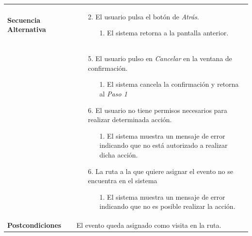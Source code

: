 \begin{longtable}{| p{4cm} | p{10cm} |}
\\
\hline
\textbf{Secuencia Alternativa} &\mbox{}\par\vspace{-\baselineskip}
\begin{enumerate}[leftmargin=0.7cm, topsep=0.1cm]
\item[2.] El usuario pulsa el botón de \textit{Atrás}.
	\begin{itemize}
	\item[1.] El sistema retorna a la pantalla anterior.
	\end{itemize}
\end{enumerate}
\\ &\mbox{}\par\vspace{-\baselineskip}	
\begin{enumerate}[leftmargin=0.7cm, topsep=0.1cm]
\item[5.] El usuario pulso en \textit{Cancelar} en la ventana de confirmación.
	\begin{itemize}
	\item[1.] El sistema cancela la confirmación y retorna al \textit{Paso 1}
	\end{itemize}
\item[6.] El usuario no tiene permisos necesarios para realizar determinada acción.
	\begin{itemize}
	\item[1.] El sistema muestra un mensaje de error indicando que no está autorizado a realizar dicha acción.
	\end{itemize}
\item[6.] La ruta a la que quiere asignar el evento no se encuentra en el sistema
	\begin{itemize}
	\item[1.] El sistema muestra un mensaje de error indicando que no es posible realizar la acción.
	\end{itemize}
\end{enumerate}
\\

\hline
\textbf{Postcondiciones} & 
El evento queda asignado como visita en la ruta.\\
\hline
\end{longtable}



\newpage
